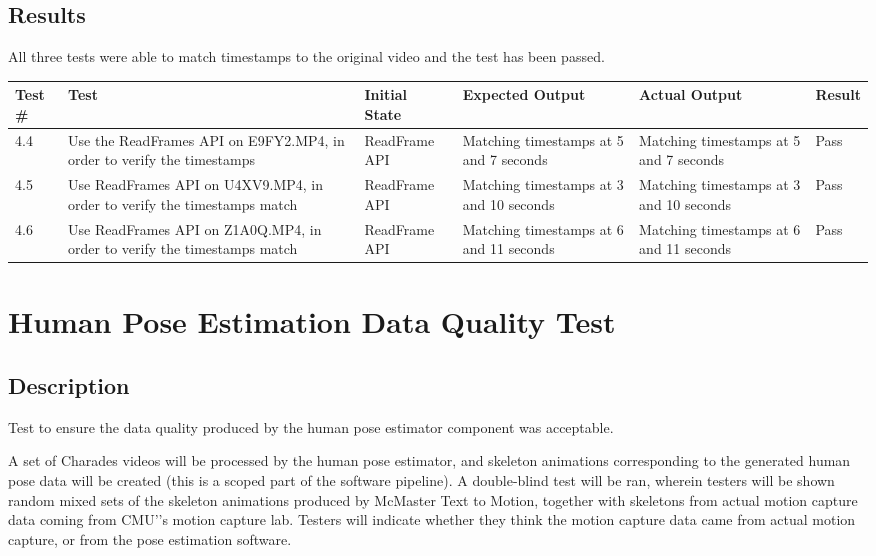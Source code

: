 \documentclass{scrreprt}
\begin{document}
\subsection{Results}

All three tests were able to match timestamps to the original video and the test has been passed.

\begin{table}[H]
        \centering
        \begin{tabular}[t]{||p{0.75cm}|p{4cm}|p{2.5cm}|p{3cm}|p{2.5cm}|p{1cm}||}
                \hline
                \textbf Test \# & \textbf Test & \textbf Initial State & \textbf Expected Output & \textbf Actual Output & \textbf Result\\
                \hline\hline
                4.4 & Use the ReadFrames API on E9FY2.MP4, in order to verify the timestamps & ReadFrame API & Matching timestamps at 5 and 7 seconds & Matching timestamps at 5 and 7 seconds & Pass\\
                \hline
                4.5 & Use ReadFrames API on U4XV9.MP4, in order to verify the timestamps match & ReadFrame API & Matching timestamps at 3 and 10 seconds & Matching timestamps at 3 and 10 seconds & Pass\\
                \hline
                4.6 & Use ReadFrames API on Z1A0Q.MP4, in order to verify the timestamps match & ReadFrame API & Matching timestamps at 6 and 11 seconds & Matching timestamps at 6 and 11 seconds  & Pass\\
                \hline
        \end{tabular}
\end{table}

\section{Human Pose Estimation Data Quality Test}
\subsection{Description}

Test to ensure the data quality produced by the human pose estimator component
was acceptable.

A set of Charades videos will be processed by the human pose estimator, and
skeleton animations corresponding to the generated human pose data will be
created (this is a scoped part of the software pipeline). A double-blind test
will be ran, wherein testers will be shown random mixed sets of the skeleton
animations produced by McMaster Text to Motion, together with skeletons from
actual motion capture data coming from CMU'’s motion capture lab. Testers will
indicate whether they think the motion capture data came from actual motion
capture, or from the pose estimation software.
\end{document}
